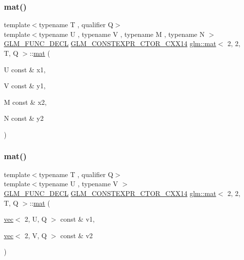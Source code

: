 \mbox{\label{structglm_1_1mat_3_012_00_012_00_01_t_00_01_q_01_4_aac74687c9f4e9b9155fb1e72bf5c5be0}} 
\subsubsection{\texorpdfstring{mat()}{mat()}\hspace{0.1cm}{\footnotesize\ttfamily [7/21]}}
{\footnotesize\ttfamily template$<$typename T , qualifier Q$>$ \\
template$<$typename U , typename V , typename M , typename N $>$ \\
\mbox{\hyperlink{setup_8hpp_ab2d052de21a70539923e9bcbf6e83a51}{G\+L\+M\+\_\+\+F\+U\+N\+C\+\_\+\+D\+E\+CL}} \mbox{\hyperlink{setup_8hpp_a0900f9145e68bf6061b6f5e7be3fa751}{G\+L\+M\+\_\+\+C\+O\+N\+S\+T\+E\+X\+P\+R\+\_\+\+C\+T\+O\+R\+\_\+\+C\+X\+X14}} \mbox{\hyperlink{structglm_1_1mat}{glm\+::mat}}$<$ 2, 2, T, Q $>$\+::\mbox{\hyperlink{structglm_1_1mat}{mat}} (\begin{DoxyParamCaption}\item[{U const \&}]{x1,  }\item[{V const \&}]{y1,  }\item[{M const \&}]{x2,  }\item[{N const \&}]{y2 }\end{DoxyParamCaption})}

\mbox{\label{structglm_1_1mat_3_012_00_012_00_01_t_00_01_q_01_4_a5bae47b291567292c6931d1fa10b5798}} 
\subsubsection{\texorpdfstring{mat()}{mat()}\hspace{0.1cm}{\footnotesize\ttfamily [8/21]}}
{\footnotesize\ttfamily template$<$typename T , qualifier Q$>$ \\
template$<$typename U , typename V $>$ \\
\mbox{\hyperlink{setup_8hpp_ab2d052de21a70539923e9bcbf6e83a51}{G\+L\+M\+\_\+\+F\+U\+N\+C\+\_\+\+D\+E\+CL}} \mbox{\hyperlink{setup_8hpp_a0900f9145e68bf6061b6f5e7be3fa751}{G\+L\+M\+\_\+\+C\+O\+N\+S\+T\+E\+X\+P\+R\+\_\+\+C\+T\+O\+R\+\_\+\+C\+X\+X14}} \mbox{\hyperlink{structglm_1_1mat}{glm\+::mat}}$<$ 2, 2, T, Q $>$\+::\mbox{\hyperlink{structglm_1_1mat}{mat}} (\begin{DoxyParamCaption}\item[{\mbox{\hyperlink{structglm_1_1vec}{vec}}$<$ 2, U, Q $>$ const \&}]{v1,  }\item[{\mbox{\hyperlink{structglm_1_1vec}{vec}}$<$ 2, V, Q $>$ const \&}]{v2 }\end{DoxyParamCaption})}

